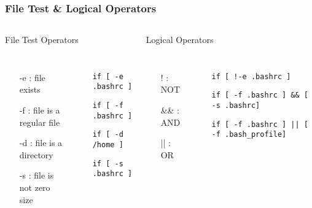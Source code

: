 \documentclass[slidestop,mathserif,compress,xcolor=svgnames]{beamer}
\newenvironment{eblock}[0]
{
\begin{beamerboxesrounded}[upper=uppercol2,lower=lowercol2,shadow=true]}
{\end{beamerboxesrounded}}
\begin{document}
\begin{frame}
  \frametitle{\small File Test \& Logical Operators}
  \vspace{-0.5cm}
  \begin{columns}
    \column{11.5cm}
    \begin{eblock}{File Test Operators}
      \vspace{-0.2cm}
      \begin{columns}
        \column{4cm}
        \begin{itemize}
          \item[-e]: file exists
          \item[-f]: file is a regular file
          \item[-d]: file is a directory
          \item[-s]: file is not zero size
        \end{itemize}
        \column{7cm}
        \begin{itemize}
          \item[] \texttt{if [ -e .bashrc ]}
          \item[] \texttt{if [ -f .bashrc ]}
          \item[] \texttt{if [ -d /home ] }
          \item[] \texttt{if [ -s .bashrc ]}
        \end{itemize}
      \end{columns}
    \end{eblock}
    \begin{eblock}{Logical Operators}
      \vspace{-0.2cm}
      \begin{columns}
        \column{2cm}
        \begin{itemize}
          \item[!]: NOT
          \item[\&\&]: AND
          \item[||]: OR
        \end{itemize}
        \column{9cm}
        \begin{itemize}
          \item[] \texttt{if [ !-e .bashrc ]}
          \item[] \texttt{if [ -f .bashrc ] \&\& [ -s .bashrc]}
          \item[] \texttt{if [ -f .bashrc ] || [ -f .bash\_profile] }
        \end{itemize}
      \end{columns}
    \end{eblock}
  \end{columns}
\end{frame}
\end{document}
